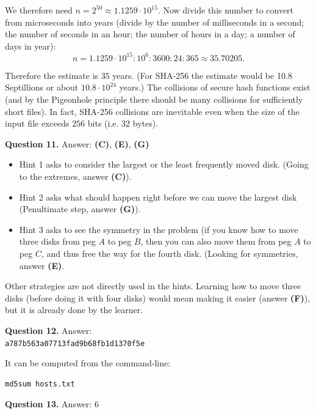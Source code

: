 \documentclass[jou]{apa6}
\begin{document}
We therefore need $n = 2^{50} \approx 1.1259 \cdot{10}^{15}$. Now divide this number to convert from 
microseconds into years (divide by the number of milliseconds in a second; the number of seconds in an hour; 
the number of hours in a day; a number of days in year): 
$$n = 1.1259 \cdot{10}^{15} : 10^6 : 3600 : 24 : 365 \approx 35.70205.$$

Therefore the estimate is $35$ years. (For SHA-256 the estimate would be 10.8 Septillions or
about $10.8\cdot 10^{24}$ years.) The collisions of secure hash functions exist (and by the 
Pigeonhole principle there should be many collisions for sufficiently short files). In fact, 
SHA-256 collisions are inevitable even when the size of the input file exceeds $256$ bits (i.e. 
$32$ bytes).





\vspace{10pt}
{\bf Question 11.} Answer: {\bf (C)}, {\bf (E)}, {\bf (G)}\\
\begin{itemize}
\item Hint 1 asks to consider the largest or the least frequently moved disk.
(Going to the extremes, answer {\bf (C)}).
\item Hint 2 asks what should happen right before we can move the largest disk
(Penultimate step, answer {\bf (G)}).
\item Hint 3 asks to see the symmetry in the problem (if you know how to move 
three disks from peg $A$ to peg $B$, then you can also move them from peg $A$ to peg $C$, 
and thus free the way for the fourth disk. 
(Looking for symmetries, answer {\bf (E)}. 
\end{itemize}

Other strategies are not directly used in the hints. Learning how to move 
three disks (before doing it with four disks) would mean making it easier (answer {\bf (F)}), 
but it is already done by the learner.


\vspace{10pt}
{\bf Question 12.} Answer:\\
{\tt a787b563a07713fad9b68fb1d1370f5e}

It can be computed from the command-line: 
\begin{verbatim}
md5sum hosts.txt
\end{verbatim}



\vspace{10pt}
{\bf Question 13.} Answer: $6$\\
\end{document}
